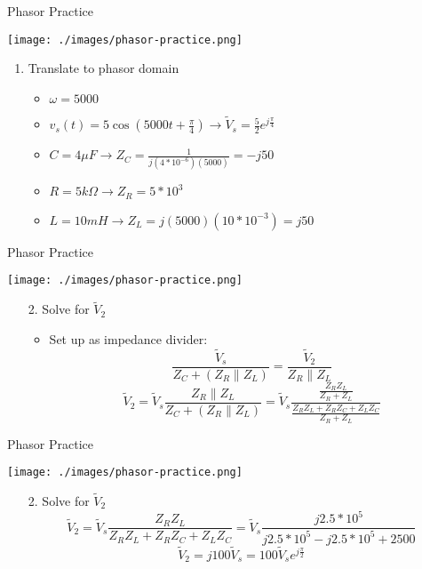    \begin{frame}{Phasor Practice}
        \begin{center}
            \texttt{[image: ./images/phasor-practice.png]}
        \end{center}
        \begin{enumerate}
            \item Translate to phasor domain
            \begin{itemize}
                \item $\omega=5000$
                \item $v_s(t)=5\cos(5000t+\frac{\pi}{4})\rightarrow \tilde{V}_s=\frac{5}{2}e^{j\frac{\pi}{4}}$
                \item $C=4\mu F\rightarrow Z_C=\frac{1}{j(4*10^{-6})(5000)}=-j50$
                \item $R=5k\Omega\rightarrow Z_R=5*10^3$
                \item $L=10mH\rightarrow Z_L=j(5000)(10*10^{-3})=j50$
            \end{itemize}
        \end{enumerate}
    \end{frame}
    
    \begin{frame}{Phasor Practice}
        \begin{center}
            \texttt{[image: ./images/phasor-practice.png]}
        \end{center}
        \begin{enumerate}
            \item[2.] Solve for $\tilde{V}_2$
            \begin{itemize}
                \item Set up as impedance divider: $$\frac{\tilde{V}_s}{Z_C+(Z_R\| Z_L)}=\frac{\tilde{V}_2}{Z_R\| Z_L}$$
                $$\tilde{V}_2=\tilde{V}_s\frac{Z_R\|Z_L}{Z_C+(Z_R\|Z_L)}=\tilde{V}_s\frac{\frac{Z_RZ_L}{Z_R+Z_L}}{\frac{Z_RZ_L+Z_RZ_C+Z_LZ_C}{Z_R+Z_L}}$$
            \end{itemize}
        \end{enumerate}
    \end{frame}
    
    \begin{frame}{Phasor Practice}
        \begin{center}
            \texttt{[image: ./images/phasor-practice.png]}
        \end{center}
        \begin{enumerate}
            \item[2.] Solve for $\tilde{V}_2$
            $$\tilde{V}_2=\tilde{V}_s\frac{Z_RZ_L}{Z_RZ_L+Z_RZ_C+Z_LZ_C}=\tilde{V}_s\frac{j2.5*10^5}{j2.5*10^5-j2.5*10^5+2500}$$
            $$\tilde{V}_2=j100\tilde{V}_s=100\tilde{V}_se^{j\frac{\pi}{2}}$$
        \end{enumerate}
    \end{frame}
    
